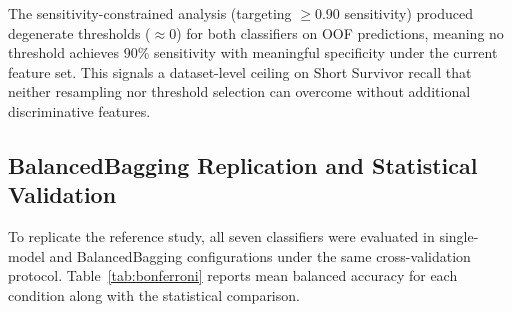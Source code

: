 \documentclass[preprint,12pt]{elsarticle}
\begin{document}
The sensitivity-constrained analysis (targeting $\geq 0.90$ sensitivity) produced
degenerate thresholds ($\approx\!0$) for both classifiers on OOF predictions,
meaning no threshold achieves 90\% sensitivity with meaningful specificity under
the current feature set. This signals a dataset-level ceiling on Short Survivor
recall that neither resampling nor threshold selection can overcome without
additional discriminative features.

\subsection{BalancedBagging Replication and Statistical Validation}

To replicate the reference study, all seven classifiers were evaluated in
single-model and BalancedBagging configurations under the same cross-validation
protocol. Table~\ref{tab:bonferroni} reports mean balanced accuracy for each
condition along with the statistical comparison.

\begin{table}[ht!]
  \centering
  \caption{Cross-validation balanced accuracy under single-model and
    BalancedBagging configurations, with per-fold Wilcoxon signed-rank tests
    (Bonferroni-corrected for 7 comparisons).
    $^{***}p \leq 0.001$; $^{**}p \leq 0.01$; n.s.\ = not significant.}
  \label{tab:bonferroni}
\end{table}
\end{document}
